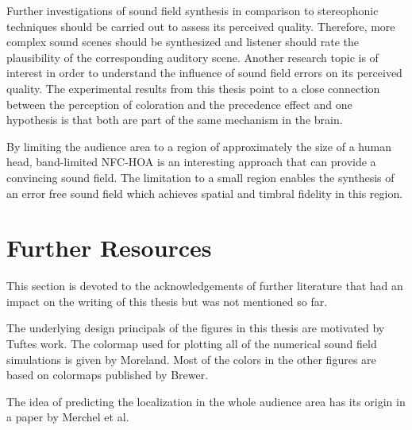 Further investigations of sound field synthesis in comparison to stereophonic techniques
should be carried out to assess its perceived quality.
Therefore, more complex sound scenes should be synthesized and listener should
rate the plausibility of the corresponding auditory scene.
Another research topic is of interest in order to understand the influence of
sound field errors on its perceived quality. The experimental results from
this thesis point to a close connection between the perception of coloration and
the precedence effect and one hypothesis is that both are part of the same
mechanism in the brain.

By limiting the audience area to a region of approximately the size of a human
head, band-limited \ac{NFC-HOA} is an interesting approach that can provide a
convincing sound field.
The limitation to a small region enables the synthesis of an error free sound
field which achieves spatial and timbral fidelity in this region.




\newpage

\newpage

\setcounter{footnote}{0}

\section*{Further Resources}
%
This section is devoted to the acknowledgements of further literature that had
an impact on the writing of this thesis but was not mentioned so far.

The underlying design principals of the figures in this thesis are motivated by
Tuftes work.
The colormap used for plotting all of the numerical sound field simulations is
given by Moreland. Most of the colors in the other
figures are based on colormaps published by
Brewer.

The idea of predicting the localization in the whole audience area has its
origin in a paper by Merchel et al.\autocite{Merchel2010}


